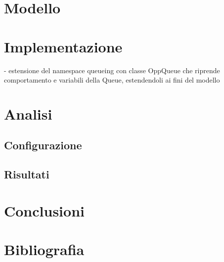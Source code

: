 \documentclass[a4paper,11pt]{article}
\begin{document}
\section{Modello}
\section{Implementazione}
- estensione del namespace queueing con classe OppQueue che riprende comportamento e variabili
della Queue, estendendoli ai fini del modello

\section{Analisi}
\subsection{Configurazione}


\subsection{Risultati}

\section{Conclusioni}

\section{Bibliografia}
\end{document}
